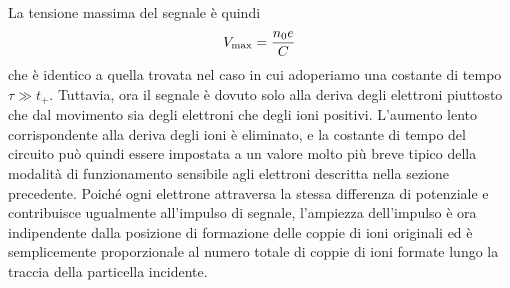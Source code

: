 \begin{approfondimento}
\begin{figure}[H]
      \centering
   \end{figure}
   La tensione massima del segnale è quindi
   \begin{equation*}
      V_{\rm max}=\frac{n_0 e}{C}
   \end{equation*}
   che è identico a quella trovata nel caso in cui adoperiamo una costante di tempo $\tau \gg t_+$. Tuttavia, ora il segnale è dovuto solo alla deriva degli elettroni piuttosto che dal movimento sia degli elettroni che degli ioni positivi. L'aumento lento corrispondente alla deriva degli ioni è eliminato, e la costante di tempo del circuito può quindi essere impostata a un valore molto più breve tipico della modalità di funzionamento sensibile agli elettroni descritta nella sezione precedente. Poiché ogni elettrone attraversa la stessa differenza di potenziale e contribuisce ugualmente all'impulso di segnale, l'ampiezza dell'impulso è ora indipendente dalla posizione di formazione delle coppie di ioni originali ed è semplicemente proporzionale al numero totale di coppie di ioni formate lungo la traccia della particella incidente.
\end{approfondimento}

\vfill

